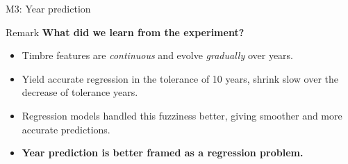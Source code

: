 \documentclass{beamer}
\begin{document}
\begin{section}{M3: Year prediction}
    \begin{frame}{Remark}
        \textbf{What did we learn from the experiment?}
        \begin{itemize}
            \item Timbre features are \textit{continuous} and evolve \textit{gradually} over years.
            \item Yield accurate regression in the tolerance of 10 years, shrink slow over the decrease of tolerance years. 
            \item Regression models handled this fuzziness better, giving smoother and more accurate predictions.
            \item \textbf{Year prediction is better framed as a regression problem.}
        \end{itemize}
    \end{frame}
\end{section}





\thankframe
\end{document}
